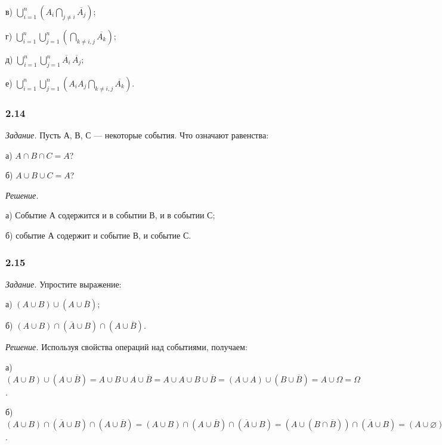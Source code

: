 \documentclass{book}
\begin{document}
в) $\bigcup\limits_{i=1}^n\left(A_i\bigcap\limits_{j\neq i}\overline{A_j}\right)$;

г) $\bigcup\limits_{i=1}^n\bigcup\limits_{j=1}^n\left(\bigcap\limits_{k\neq i, j}\overline{A_k}\right)$;

д) $\bigcup\limits_{i=1}^n\bigcup\limits_{j=1}^n\overline{A_i}\,\overline{A_j}$;

е) $\bigcup\limits_{i=1}^n\bigcup\limits_{j=1}^n\left(A_iA_j\bigcap\limits_{k\neq i, j}\overline{A_k}\right)$.

\subsubsection*{2.14}

\textit{Задание.} Пусть А, В, С --- некоторые события. Что означают равенства:

а) $A\cap B\cap C=A$?

б) $A\cup B\cup C=A$?

\textit{Решение.}

а) Событие А содержится и в событии В, и в событии С;

б) событие А содержит и событие В, и событие С.

\subsubsection*{2.15}

\textit{Задание.} Упростите выражение:

а) $\left(A\cup B\right)\cup\left(A\cup\overline{B}\right)$;

б) $\left(A\cup B\right)\cap\left(\overline{A}\cup B\right)\cap\left(A\cup\overline{B}\right)$.

\textit{Решение.} Используя свойства операций над событиями, получаем:

а) $\left(A\cup B\right)\cup\left(A\cup\overline{B}\right)=A\cup B\cup A\cup\overline{B}=A\cup A\cup B\cup\overline{B}=\left(A\cup A\right)\cup\left(B\cup\overline{B}\right)=A\cup\Omega=\Omega$.

б) $\left(A\cup B\right)\cap\left(\overline{A}\cup B\right)\cap\left(A\cup\overline{B}\right)=\left(A\cup B\right)\cap\left(A\cup\overline{B}\right)\cap\left(\overline{A}\cup B\right)=\left(A\cup\left(B\cap\overline{B}\right)\right)\cap\left(\overline{A}\cup B\right)=\left(A\cup\varnothing\right)\cap\left(\overline{A}\cup B\right)=A\cap\left(\overline{A}\cup B\right)=\left(A\cap\overline{A}\right)\cup\left(A\cap B\right)=\varnothing\cup\left(A\cap B\right)=A\cap B$.
\end{document}
